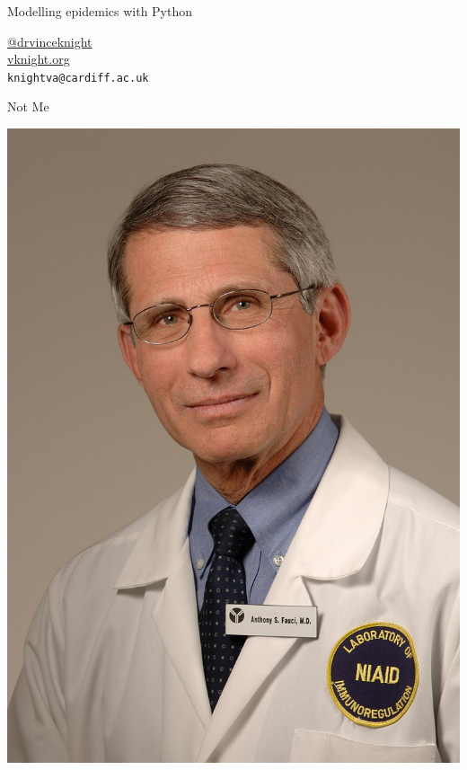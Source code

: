 \documentclass{beamer}
\begin{document}
    \begin{frame}
        \begin{center}
            \Huge

            Modelling epidemics with Python

            \Large
            \vspace{1cm}
            \href{https://twitter.com/drvinceknight}{@drvinceknight}\\
            \url{vknight.org}\\
            \texttt{knightva@cardiff.ac.uk}
        \end{center}


    \end{frame}

    \begin{frame}
        \begin{center}
            \Large
            Not Me
        \pause
        \vspace{1cm}

        \includegraphics[height=.7\textheight]{static/fauci.jpg}

        \end{center}
    \end{frame}
\end{document}
